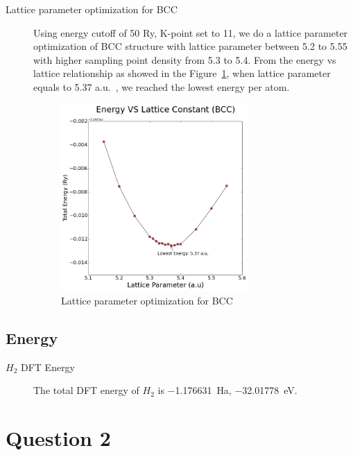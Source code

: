 \documentclass{article}
\begin{document}
\begin{description}
\item[Lattice parameter optimization for BCC]
Using energy cutoff of 50 Ry, K-point set to 11, we do a lattice parameter optimization of BCC structure with lattice parameter between 5.2 to 5.55 with higher sampling
point density from 5.3 to 5.4. 
From the energy vs lattice relationship as showed in the Figure~\ref{fig:BCC_Lattic_Opt}, when lattice parameter equals to 5.37 a.u.~, we reached the lowest energy
per atom. 

\begin{figure}[h!]
\centering
\includegraphics[width=0.7\textwidth]{Q1_BCC_Lowest_Energy_Hull.png}
\caption{Lattice parameter optimization for BCC}
\label{fig:BCC_Lattic_Opt}
\end{figure}

\end{description} 

\subsection{Energy}
\begin{description}
\item[$H_{2}$ DFT Energy]
The total DFT energy of $H_{2}$ is \SI{-1.176631}{Ha}, \SI{-32.01778}{\eV}. 
\end{description}

 

\section{Question 2 }
\end{document}
